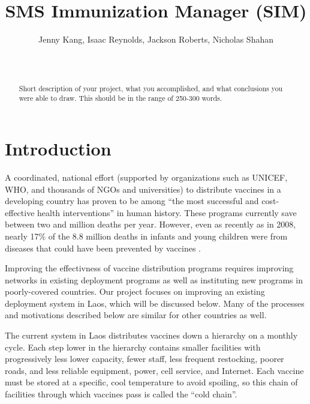 \documentclass{acm_proc_article-sp}
\begin{document}
\title{SMS Immunization Manager (SIM)}

\author{
       Jenny Kang, Isaac Reynolds, Jackson Roberts, Nicholas Shahan\\
              \\
              \\
}

\maketitle
\begin{abstract}
Short description of your project, what you accomplished, and what conclusions 
you were able to draw. This should be in the range of 250-300 words.
\end{abstract}

\section{Introduction}
A coordinated, national effort (supported by organizations such as UNICEF, WHO, and thousands of NGOs and universities) to distribute vaccines in a developing country has proven to be among ``the most successful and cost-effective health interventions'' in human history. These programs currently save between two and million deaths per year. However, even as recently as in 2008, nearly 17\% of the 8.8 million deaths in infants and young children were from diseases that could have been prevented by vaccines \cite{who:campaign_essentials}. 

Improving the effectivness of vaccine distribution programs requires improving networks in existing deployment programs as well as instituting new programs in poorly-covered countries. Our project focuses on improving an existing deployment system in Laos, which will be discussed below. Many of the processes and motivations described below are similar for other countries as well.

The current system in Laos distributes vaccines down a hierarchy on a monthly cycle. Each step lower in the hierarchy contains smaller facilities with progressively less lower capacity, fewer staff, less frequent restocking, poorer roads, and less reliable equipment, power, cell service, and Internet. Each vaccine must be stored at a specific, cool temperature to avoid spoiling, so this chain of facilities through which vaccines pass is called the ``cold chain''.
\end{document}

